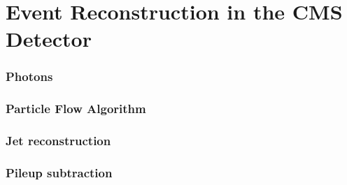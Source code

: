 \chapter{Event Reconstruction in the CMS Detector}
\label{sec:EventReconstruction}

\subsection{Photons}

\subsection{Particle Flow Algorithm}
\label{sec:ParticleFlow}

\subsection{Jet reconstruction}
\label{sec:Jet}

\subsection{Pileup subtraction}
\label{}

